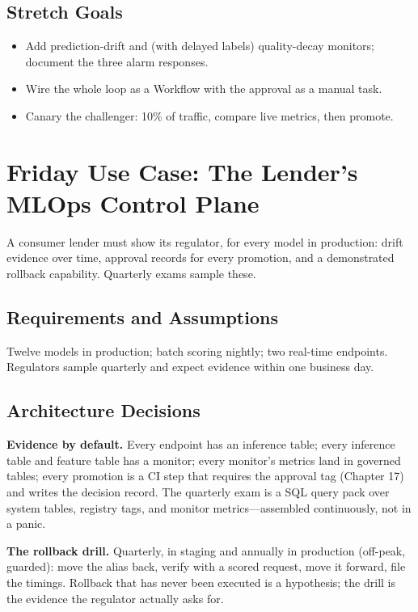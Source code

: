 \subsection*{Stretch Goals}
\begin{itemize}
    \item Add prediction-drift and (with delayed labels) quality-decay monitors; document the three alarm responses.
    \item Wire the whole loop as a Workflow with the approval as a manual task.
    \item Canary the challenger: 10\% of traffic, compare live metrics, then promote.
\end{itemize}

\section{Friday Use Case: The Lender's MLOps Control Plane}
A consumer lender must show its regulator, for every model in production: drift evidence over time, approval records for every promotion, and a demonstrated rollback capability. Quarterly exams sample these.

\subsection{Requirements and Assumptions}
Twelve models in production; batch scoring nightly; two real-time endpoints. Regulators sample quarterly and expect evidence within one business day.

\subsection{Architecture Decisions}
\textbf{Evidence by default.} Every endpoint has an inference table; every inference table and feature table has a monitor; every monitor's metrics land in governed tables; every promotion is a CI step that requires the approval tag (Chapter 17) and writes the decision record. The quarterly exam is a SQL query pack over system tables, registry tags, and monitor metrics---assembled continuously, not in a panic.

\textbf{The rollback drill.} Quarterly, in staging and annually in production (off-peak, guarded): move the alias back, verify with a scored request, move it forward, file the timings. Rollback that has never been executed is a hypothesis; the drill is the evidence the regulator actually asks for.

